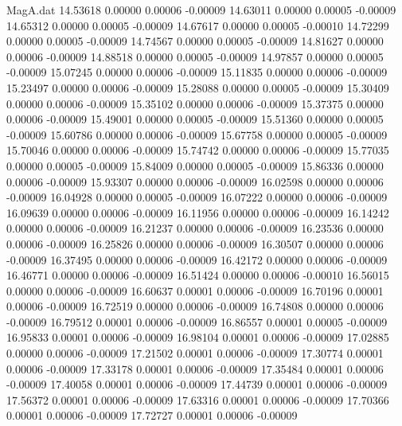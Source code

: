 \begin{filecontents}{MagA.dat}
  14.53618    0.00000    0.00006   -0.00009
  14.63011    0.00000    0.00005   -0.00009
  14.65312    0.00000    0.00005   -0.00009
  14.67617    0.00000    0.00005   -0.00010
  14.72299    0.00000    0.00005   -0.00009
  14.74567    0.00000    0.00005   -0.00009
  14.81627    0.00000    0.00006   -0.00009
  14.88518    0.00000    0.00005   -0.00009
  14.97857    0.00000    0.00005   -0.00009
  15.07245    0.00000    0.00006   -0.00009
  15.11835    0.00000    0.00006   -0.00009
  15.23497    0.00000    0.00006   -0.00009
  15.28088    0.00000    0.00005   -0.00009
  15.30409    0.00000    0.00006   -0.00009
  15.35102    0.00000    0.00006   -0.00009
  15.37375    0.00000    0.00006   -0.00009
  15.49001    0.00000    0.00005   -0.00009
  15.51360    0.00000    0.00005   -0.00009
  15.60786    0.00000    0.00006   -0.00009
  15.67758    0.00000    0.00005   -0.00009
  15.70046    0.00000    0.00006   -0.00009
  15.74742    0.00000    0.00006   -0.00009
  15.77035    0.00000    0.00005   -0.00009
  15.84009    0.00000    0.00005   -0.00009
  15.86336    0.00000    0.00006   -0.00009
  15.93307    0.00000    0.00006   -0.00009
  16.02598    0.00000    0.00006   -0.00009
  16.04928    0.00000    0.00005   -0.00009
  16.07222    0.00000    0.00006   -0.00009
  16.09639    0.00000    0.00006   -0.00009
  16.11956    0.00000    0.00006   -0.00009
  16.14242    0.00000    0.00006   -0.00009
  16.21237    0.00000    0.00006   -0.00009
  16.23536    0.00000    0.00006   -0.00009
  16.25826    0.00000    0.00006   -0.00009
  16.30507    0.00000    0.00006   -0.00009
  16.37495    0.00000    0.00006   -0.00009
  16.42172    0.00000    0.00006   -0.00009
  16.46771    0.00000    0.00006   -0.00009
  16.51424    0.00000    0.00006   -0.00010
  16.56015    0.00000    0.00006   -0.00009
  16.60637    0.00001    0.00006   -0.00009
  16.70196    0.00001    0.00006   -0.00009
  16.72519    0.00000    0.00006   -0.00009
  16.74808    0.00000    0.00006   -0.00009
  16.79512    0.00001    0.00006   -0.00009
  16.86557    0.00001    0.00005   -0.00009
  16.95833    0.00001    0.00006   -0.00009
  16.98104    0.00001    0.00006   -0.00009
  17.02885    0.00000    0.00006   -0.00009
  17.21502    0.00001    0.00006   -0.00009
  17.30774    0.00001    0.00006   -0.00009
  17.33178    0.00001    0.00006   -0.00009
  17.35484    0.00001    0.00006   -0.00009
  17.40058    0.00001    0.00006   -0.00009
  17.44739    0.00001    0.00006   -0.00009
  17.56372    0.00001    0.00006   -0.00009
  17.63316    0.00001    0.00006   -0.00009
  17.70366    0.00001    0.00006   -0.00009
  17.72727    0.00001    0.00006   -0.00009

\end{filecontents}
